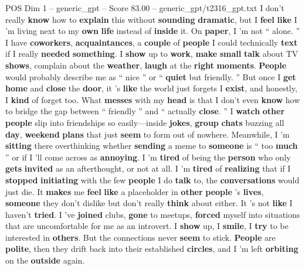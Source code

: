 \begin{textsample}{POS Dim 1 – generic\_gpt – Score 83.00 – generic\_gpt/t2316\_gpt.txt}  \label{ex:f1_pos_005}
I don't really \textbf{know} how to \textbf{explain} this without \textbf{sounding} \textbf{dramatic}, but I \textbf{feel} \textbf{like} I ’m living next to my \textbf{own} \textbf{life} instead of \textbf{inside} it.
On \textbf{paper}, I ’m not “ alone. ” I have \textbf{coworkers}, \textbf{acquaintances}, a \textbf{couple} of \textbf{people} I could technically \textbf{text} if I really \textbf{needed} \textbf{something}.
I \textbf{show} up to \textbf{work}, \textbf{make} \textbf{small} \textbf{talk} about TV \textbf{shows}, complain about the \textbf{weather}, \textbf{laugh} at the \textbf{right} \textbf{moments}. \textbf{People} would probably describe me as “ nice ” or “ \textbf{quiet} but friendly. ” But once I \textbf{get} \textbf{home} and \textbf{close} the \textbf{door}, it ’s \textbf{like} the world just forgets I \textbf{exist}, and honestly, I \textbf{kind} of forget too.
What \textbf{messes} with my \textbf{head} is that I don't even \textbf{know} how to bridge the gap between “ friendly ” and “ actually \textbf{close}. ” I \textbf{watch} \textbf{other} \textbf{people} slip into friendships so easily—inside \textbf{jokes}, \textbf{group} \textbf{chats} buzzing all \textbf{day}, \textbf{weekend} \textbf{plans} that just \textbf{seem} to form out of nowhere.
Meanwhile, I ’m \textbf{sitting} there overthinking whether \textbf{sending} a meme to \textbf{someone} is “ too \textbf{much} ” or if I ’ll come across as \textbf{annoying}.
I ’m \textbf{tired} of being the \textbf{person} who only \textbf{gets} \textbf{invited} as an afterthought, or not at all.
I ’m \textbf{tired} of \textbf{realizing} that if I \textbf{stopped} \textbf{initiating} with the few \textbf{people} I do \textbf{talk} to, the \textbf{conversations} would just die.
It \textbf{makes} me \textbf{feel} \textbf{like} a placeholder in \textbf{other} \textbf{people} ’s \textbf{lives}, \textbf{someone} they don't dislike but don't really \textbf{think} about either.
It ’s not \textbf{like} I haven't \textbf{tried}.
I ’ve \textbf{joined} clubs, \textbf{gone} to meetups, \textbf{forced} myself into situations that are uncomfortable for me as an introvert.
I \textbf{show} up, I \textbf{smile}, I \textbf{try} to be interested in \textbf{others}.
But the connections never \textbf{seem} to stick. \textbf{People} are \textbf{polite}, then they drift back into their established \textbf{circles}, and I ’m left \textbf{orbiting} on the \textbf{outside} again.

\end{textsample}
